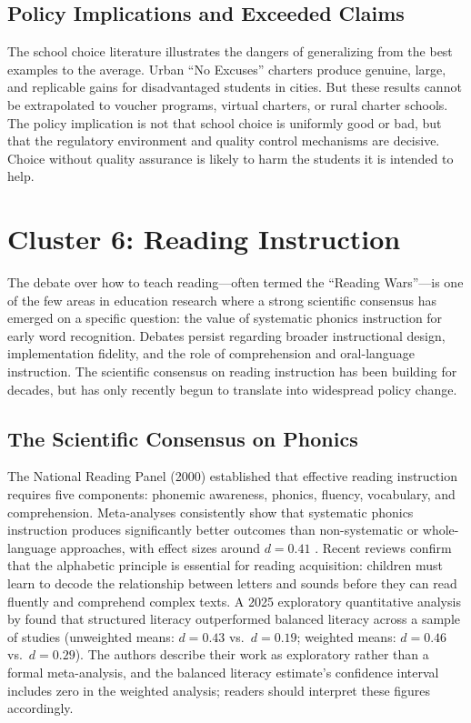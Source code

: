 \documentclass[12pt,letterpaper]{article}
\begin{document}
\subsection{Policy Implications and Exceeded Claims}

The school choice literature illustrates the dangers of generalizing from the best examples to the average. Urban ``No Excuses'' charters produce genuine, large, and replicable gains for disadvantaged students in cities. But these results cannot be extrapolated to voucher programs, virtual charters, or rural charter schools. The policy implication is not that school choice is uniformly good or bad, but that the regulatory environment and quality control mechanisms are decisive. Choice without quality assurance is likely to harm the students it is intended to help.


\section{Cluster 6: Reading Instruction}

The debate over how to teach reading---often termed the ``Reading Wars''---is one of the few areas in education research where a strong scientific consensus has emerged on a specific question: the value of systematic phonics instruction for early word recognition. Debates persist regarding broader instructional design, implementation fidelity, and the role of comprehension and oral-language instruction. The scientific consensus on reading instruction has been building for decades, but has only recently begun to translate into widespread policy change.

\subsection{The Scientific Consensus on Phonics}

The National Reading Panel (2000) established that effective reading instruction requires five components: phonemic awareness, phonics, fluency, vocabulary, and comprehension. Meta-analyses consistently show that systematic phonics instruction produces significantly better outcomes than non-systematic or whole-language approaches, with effect sizes around $d = 0.41$ \citep{ehri2001}. Recent reviews \citep{castles2018} confirm that the alphabetic principle is essential for reading acquisition: children must learn to decode the relationship between letters and sounds before they can read fluently and comprehend complex texts. A 2025 exploratory quantitative analysis by \citet{hansford2025} found that structured literacy outperformed balanced literacy across a sample of studies (unweighted means: $d = 0.43$ vs.\ $d = 0.19$; weighted means: $d = 0.46$ vs.\ $d = 0.29$). The authors describe their work as exploratory rather than a formal meta-analysis, and the balanced literacy estimate's confidence interval includes zero in the weighted analysis; readers should interpret these figures accordingly.
\end{document}
